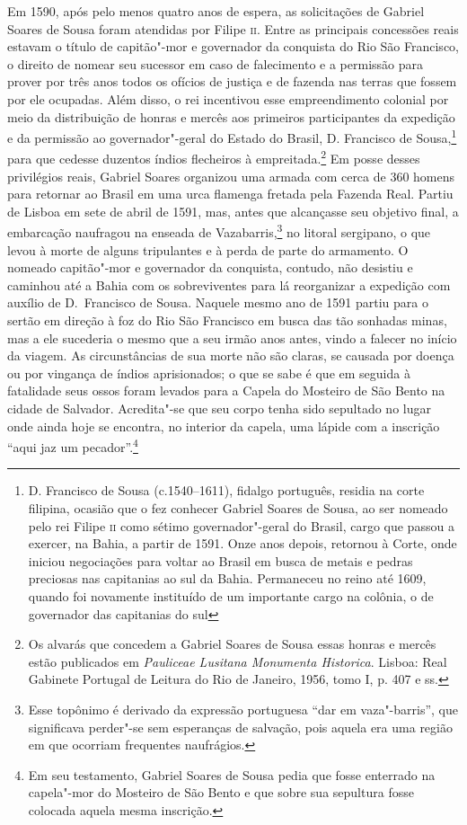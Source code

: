 \documentclass[12pt]{extarticle}
\begin{document}
Em 1590, após pelo menos quatro anos de espera, as solicitações de
Gabriel Soares de Sousa foram atendidas por Filipe \textsc{ii}. Entre as
principais concessões reais estavam o título de capitão"-mor e
governador da conquista do Rio São Francisco, o direito de nomear seu
sucessor em caso de falecimento e a permissão para prover por três anos
todos os ofícios de justiça e de fazenda nas terras que fossem por ele
ocupadas. Além disso, o rei incentivou esse empreendimento colonial por
meio da distribuição de honras e mercês aos primeiros participantes da
expedição e da permissão ao governador"-geral do Estado do Brasil, D.
Francisco de Sousa,\footnote{ D. Francisco de Sousa (c.1540--1611),
fidalgo português, residia na corte filipina, ocasião que o fez
conhecer Gabriel Soares de Sousa, ao ser nomeado pelo rei Filipe 	\textsc{ii}
como sétimo governador"-geral do Brasil, cargo que passou a exercer, na
Bahia, a partir de 1591. Onze anos depois, retornou à Corte, onde
iniciou negociações para voltar ao Brasil em busca de metais e pedras
preciosas nas capitanias ao sul da Bahia. Permaneceu no reino até 1609,
quando foi novamente instituído de um importante cargo na colônia, o de
governador das capitanias do sul} para que cedesse duzentos índios
flecheiros à empreitada.\footnote{ Os alvarás que concedem a Gabriel
Soares de Sousa essas honras e mercês estão publicados em\textit{
Pauliceae Lusitana Monumenta Historica}. Lisboa: Real Gabinete Portugal
de Leitura do Rio de Janeiro, 1956, tomo I, p. 407 e ss.} Em posse
desses privilégios reais, Gabriel Soares organizou uma armada com cerca
de 360 homens para retornar ao Brasil em uma urca
flamenga fretada pela Fazenda Real. Partiu de Lisboa em sete de abril
de 1591, mas, antes que alcançasse seu objetivo final, a embarcação
naufragou na enseada de Vazabarris,\footnote{ Esse topônimo é derivado
da expressão portuguesa “dar em vaza"-barris”, que significava perder"-se
sem esperanças de salvação, pois aquela era uma região em que ocorriam
frequentes naufrágios.} no litoral sergipano, o que levou à morte de
alguns tripulantes e à perda de parte do armamento. O nomeado
capitão"-mor e governador da conquista, contudo, não desistiu e caminhou
até a Bahia com os sobreviventes para lá reorganizar a expedição com
auxílio de D.~Francisco de Sousa. Naquele mesmo ano de 1591 partiu para
o sertão em direção à foz do Rio São Francisco em busca das tão
sonhadas minas, mas a ele sucederia o mesmo que a seu irmão anos antes,
vindo a falecer no início da viagem. As circunstâncias de sua morte não
são claras, se causada por doença ou por vingança de índios
aprisionados; o que se sabe é que em seguida à fatalidade seus ossos
foram levados para a Capela do Mosteiro de São Bento na cidade de
Salvador. Acredita"-se que seu corpo tenha sido sepultado no lugar onde
ainda hoje se encontra, no interior da capela, uma lápide com a
inscrição ``aqui jaz um pecador''.\footnote{ Em seu
testamento, Gabriel Soares de Sousa pedia que fosse enterrado na 
capela"-mor do Mosteiro de São Bento e que sobre sua sepultura fosse colocada
aquela mesma inscrição.}
\end{document}
